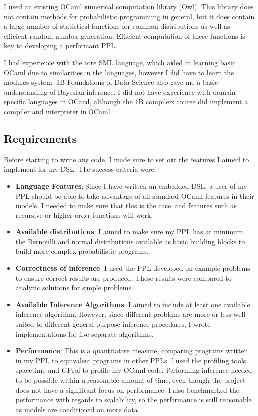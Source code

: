 \documentclass[sigconf]{acmart}
\begin{document}
I used an existing OCaml numerical computation library (Owl). This library does not contain methods for probabilistic programming in general, but it does contain a large number of statistical functions for common distributions as well as efficient random number generation. Efficient computation of these functions is key to developing a performant PPL.

I had experience with the core SML language, which aided in learning basic OCaml due to similarities in the languages, however I did have to learn the modules system. 1B Foundations of Data Science also gave me a basic understanding of Bayesian inference. I did not have experience with domain specific languages in OCaml, although the 1B compilers course did implement a compiler and interpreter in OCaml.

\subsection{Requirements}

Before starting to write any code, I made sure to set out the features I aimed to implement for my DSL. The success criteria were:

\begin{itemize}
\item \textbf{Language Features}: Since I have written an embedded DSL, a user of my PPL should be able to take advantage of all standard OCaml features in their models. I needed to make sure that this is the case, and features such as recursive or higher order functions will work.
\item \textbf{Available distributions}: I aimed to make sure my PPL has at minimum the Bernoulli and normal distributions available as basic building blocks to build more complex probabilistic programs.
\item \textbf{Correctness of inference}: I used the PPL developed on example problems to ensure correct results are produced. These results were compared to analytic solutions for simple problems.
\item \textbf{Available Inference Algorithms}: I aimed to include at least one available inference algorithm. However, since different problems are more or less well suited to different general-purpose inference procedures, I wrote implementations for five separate algorithms.
\item \textbf{Performance}: This is a quantitative measure, comparing programs written in my PPL to equivalent programs in other PPLs. I used the profiling tools spacetime and GProf to profile my OCaml code. Performing inference needed to be possible within a reasonable amount of time, even though the project does not have a significant focus on performance. I also benchmarked the performance with regards to scalability, so the performance is still reasonable as models are conditioned on more data.
\end{itemize}
\end{document}
